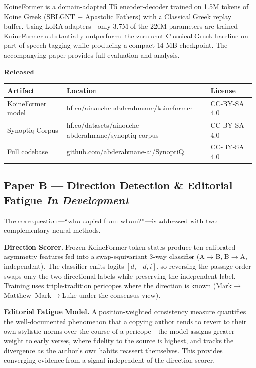 \documentclass[11pt,letterpaper]{article}
\newcommand{\tblhead}{\rowcolor{marine!12}}
\begin{document}
KoineFormer is a domain-adapted T5 encoder-decoder trained on 1.5M tokens
of Koine Greek (SBLGNT + Apostolic Fathers) with a Classical Greek replay
buffer.  Using LoRA adapters---only 3.7M of the 220M parameters are
trained---KoineFormer substantially outperforms the zero-shot Classical
Greek baseline on part-of-speech tagging while producing a compact 14 MB
checkpoint.  The accompanying paper provides full evaluation and analysis.

\medskip
\begin{tcolorbox}[
  enhanced, breakable,
  colback=marine!6, colframe=marine!30,
  boxrule=0.5pt, arc=3pt,
  left=12pt, right=12pt, top=8pt, bottom=8pt
]
{\headfont\bfseries\color{marine} Released}\\[4pt]
\begin{tabular}{@{}L{4cm}L{5.5cm}L{3cm}@{}}
\toprule
\tblhead\textbf{Artifact} & \textbf{Location} & \textbf{License} \\
\midrule
KoineFormer model & hf.co/ainouche-abderahmane/koineformer & CC-BY-SA 4.0 \\
Synoptiq Corpus & hf.co/datasets/ainouche-abderahmane/synoptiq-corpus & CC-BY-SA 4.0 \\
Full codebase & github.com/abderahmane-ai/SynoptiQ & CC-BY-SA 4.0 \\
\bottomrule
\end{tabular}
\end{tcolorbox}

\subsection{Paper B --- Direction Detection \& Editorial Fatigue \hfill \textit{In Development}}

The core question---``who copied from whom?''---is addressed with two
complementary neural methods.

\textbf{Direction Scorer.}  Frozen KoineFormer token states produce ten
calibrated asymmetry features fed into a swap-equivariant 3-way classifier
(A$\rightarrow$B, B$\rightarrow$A, independent).  The classifier emits
logits $[d, -d, i]$, so reversing the passage order swaps only the two
directional labels while preserving the independent label.
Training uses triple-tradition pericopes where the direction is known
(Mark$\rightarrow$Matthew, Mark$\rightarrow$Luke under the consensus
view).

\textbf{Editorial Fatigue Model.}  A position-weighted consistency measure
quantifies the well-documented phenomenon that a copying author tends to
revert to their own stylistic norms over the course of a pericope---the
model assigns greater weight to early verses, where fidelity to the
source is highest, and tracks the divergence as the author's own habits
reassert themselves.  This provides converging evidence from a signal
independent of the direction scorer.
\end{document}
